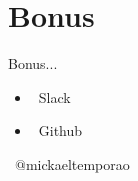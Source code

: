 \documentclass[10pt]{beamer}
\begin{document}
\section{Bonus}

\begin{frame}{Bonus...}
        \begin{itemize}
            \item[] \faSlack ~Slack
            \item[] \faGithubSquare~Github
        \end{itemize}
\end{frame}


\begin{frame}[standout]
    \begin{flushright}
        \vspace{100pt}
        \small\faTwitter~$@$mickaeltemporao
    \end{flushright}
\end{frame}
\end{document}
